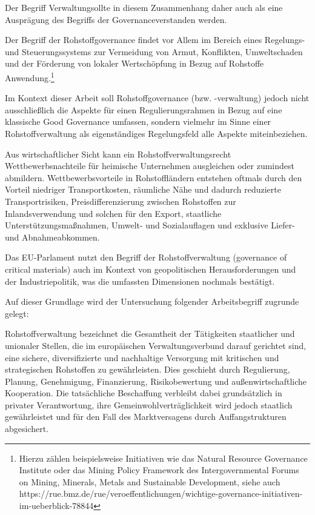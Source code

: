 \documentclass[12pt,a4paper,oneside]{book} %
\begin{document}
{	Der Begriff \glqq Verwaltung\grqq sollte in diesem Zusammenhang daher auch als eine Ausprägung des Begriffs der \glqq Governance\grqq verstanden werden.
	
	Der Begriff der Rohstoffgovernance findet vor Allem im Bereich eines Regelungs- und Steuerungssystems zur Vermeidung von Armut, Konflikten, Umweltschaden und der Förderung von lokaler Wertschöpfung in Bezug auf Rohstoffe Anwendung.\footnote{Hierzu zählen beispielsweise Initiativen wie das Natural Resource Governance Institute oder das Mining Policy Framework des Intergovernmental Forums on Mining, Minerals, Metals and Sustainable Development, siehe auch https://rue.bmz.de/rue/veroeffentlichungen/wichtige-governance-initiativen-im-ueberblick-78844}
	
	Im Kontext dieser Arbeit soll Rohstoffgovernance (bzw. -verwaltung) jedoch nicht ausschließlich die Aspekte für einen Regulierungsrahmen in Bezug auf eine klassische Good Governance umfassen, sondern vielmehr im Sinne einer Rohstoffverwaltung als eigenständiges Regelungsfeld alle Aspekte miteinbeziehen.
	
	Aus wirtschaftlicher Sicht kann ein Rohstoffverwaltungsrecht Wettbewerbsnachteile für heimische Unternehmen ausgleichen oder zumindest abmildern. Wettbewerbsvorteile in Rohstoffländern entstehen oftmals durch den Vorteil niedriger Transportkosten, räumliche Nähe und dadurch reduzierte Transportrisiken, Preisdifferenzierung zwischen Rohstoffen zur Inlandsverwendung und solchen für den Export, staatliche Unterstützungsmaßnahmen, Umwelt- und Sozialauflagen und exklusive Liefer- und Abnahmeabkommen.\autocite{IW, Rohstoffe für die Industrie, S. 18-19}
	
	Das EU-Parlament nutzt den Begriff der Rohstoffverwaltung (\glqq governance of critical materials\grqq ) auch im Kontext von geopolitischen Herausforderungen und der Industriepolitik,\autocite{PE 786.415, S. 18} was die umfassten Dimensionen nochmals bestätigt.
	
	Auf dieser Grundlage wird der Untersuchung folgender Arbeitsbegriff zugrunde gelegt:
	
	Rohstoffverwaltung bezeichnet die Gesamtheit der Tätigkeiten staatlicher und unionaler Stellen, die im europäischen Verwaltungsverbund darauf gerichtet sind, eine sichere, diversifizierte und nachhaltige Versorgung mit kritischen und strategischen Rohstoffen zu gewährleisten. Dies geschieht durch Regulierung, Planung, Genehmigung, Finanzierung, Risikobewertung und außenwirtschaftliche Kooperation. Die tatsächliche Beschaffung verbleibt dabei grundsätzlich in privater Verantwortung, ihre Gemeinwohlverträglichkeit wird jedoch staatlich gewährleistet und für den Fall des Marktversagens durch Auffangstrukturen abgesichert.
	
}
\end{document}
